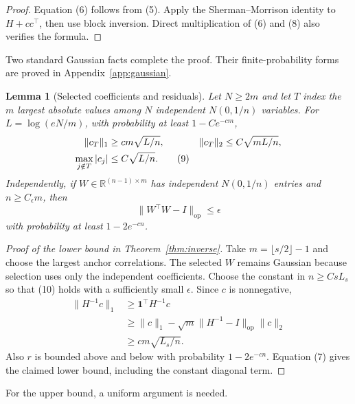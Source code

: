 \documentclass[twoside]{article}
\newtheorem{lemma}[theorem]{Lemma}
\newcommand{\R}{\mathbb R}
\begin{document}
\begin{proof}
Equation (6) follows from (5). Apply the Sherman--Morrison identity to
$H+cc^\top$, then use block inversion. Direct multiplication of (6) and (8)
also verifies the formula.
\end{proof}

Two standard Gaussian facts complete the proof. Their finite-probability forms
are proved in Appendix~\ref{app:gaussian}.

\begin{lemma}[Selected coefficients and residuals]
\label{lem:gaussian}
Let $N\geq2m$ and let $T$ index the $m$ largest absolute values among
$N$ independent $N(0,1/n)$ variables. For $L=\log(eN/m)$, with probability
at least $1-Ce^{-cm}$,
\begin{align}
 \|c_T\|_1&\geq cm\sqrt{L/n},
 &\|c_T\|_2&\leq C\sqrt{mL/n},\notag\\
 \max_{j\notin T}|c_j|&\leq C\sqrt{L/n}.
 \tag{9}
\end{align}
Independently, if $W\in\R^{(n-1)\times m}$ has independent $N(0,1/n)$
entries and $n\geq C_\epsilon m$, then
\[
 \|W^\top W-I\|_{\mathrm{op}}\leq\epsilon
 \tag{10}
\]
with probability at least $1-2e^{-cn}$.
\end{lemma}

\begin{proof}[Proof of the lower bound in Theorem~\ref{thm:inverse}]
Take $m=\lfloor s/2\rfloor-1$ and choose the largest anchor correlations.
The selected $W$ remains Gaussian because selection uses only the independent
coefficients. Choose the constant in $n\geq CsL_s$ so that (10) holds with a
sufficiently small $\epsilon$. Since $c$ is nonnegative,
\begin{align*}
 \|H^{-1}c\|_1
 &\geq \boldsymbol1^\top H^{-1}c\\
 &\geq \|c\|_1-\sqrt m\|H^{-1}-I\|_{\mathrm{op}}\|c\|_2\\
 &\geq cm\sqrt{L_s/n}.
\end{align*}
Also $r$ is bounded above and below with probability $1-2e^{-cn}$.
Equation (7) gives the claimed lower bound, including the constant diagonal
term.
\end{proof}

For the upper bound, a uniform argument is needed.
\end{document}
